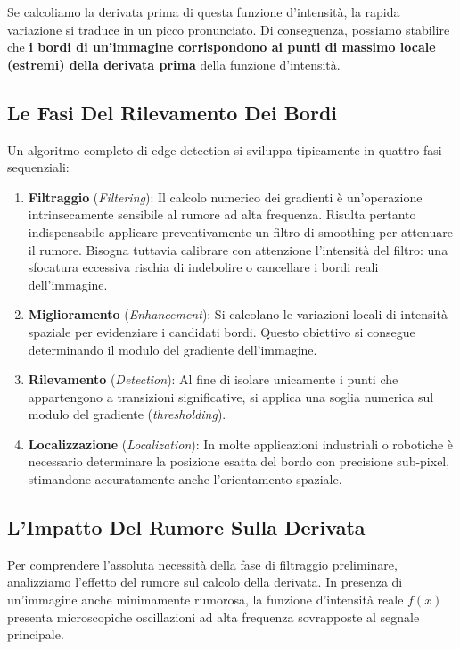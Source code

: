 ﻿\documentclass[11pt, a4paper]{article}
\begin{document}
Se calcoliamo la derivata prima di questa funzione d'intensità, la rapida variazione si traduce in un picco pronunciato. Di conseguenza, possiamo stabilire che \textbf{i bordi di un'immagine corrispondono ai punti di massimo locale (estremi) della derivata prima} della funzione d'intensità.


\subsection{Le Fasi Del Rilevamento Dei Bordi}

Un algoritmo completo di edge detection si sviluppa tipicamente in quattro fasi sequenziali:
\begin{enumerate}
    \item \textbf{Filtraggio} (\emph{Filtering}): Il calcolo numerico dei gradienti è un'operazione intrinsecamente sensibile al rumore ad alta frequenza. Risulta pertanto indispensabile applicare preventivamente un filtro di smoothing per attenuare il rumore. Bisogna tuttavia calibrare con attenzione l'intensità del filtro: una sfocatura eccessiva rischia di indebolire o cancellare i bordi reali dell'immagine.
    \item \textbf{Miglioramento} (\emph{Enhancement}): Si calcolano le variazioni locali di intensità spaziale per evidenziare i candidati bordi. Questo obiettivo si consegue determinando il modulo del gradiente dell'immagine.
    \item \textbf{Rilevamento} (\emph{Detection}): Al fine di isolare unicamente i punti che appartengono a transizioni significative, si applica una soglia numerica sul modulo del gradiente (\emph{thresholding}).
    \item \textbf{Localizzazione} (\emph{Localization}): In molte applicazioni industriali o robotiche è necessario determinare la posizione esatta del bordo con precisione sub-pixel, stimandone accuratamente anche l'orientamento spaziale.
\end{enumerate}

\subsection{L'Impatto Del Rumore Sulla Derivata}

Per comprendere l'assoluta necessità della fase di filtraggio preliminare, analizziamo l'effetto del rumore sul calcolo della derivata. In presenza di un'immagine anche minimamente rumorosa, la funzione d'intensità reale $f(x)$ presenta microscopiche oscillazioni ad alta frequenza sovrapposte al segnale principale.
\end{document}
